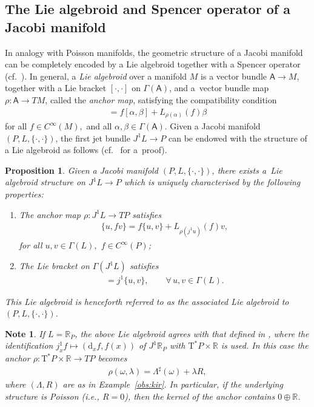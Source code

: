 \documentclass[pdftex]{sigma}
\numberwithin{equation}{section}
\newtheorem{Proposition}[Theorem]{Proposition}
\newtheorem{Note}[Theorem]{Note}
\newcommand{\de}{\mathrm{d}} %
\newcommand{\cotan}{\mathrm{T}^*} %
\newcommand{\RR}{\mathbb{R}}
\begin{document}
\subsection{The Lie algebroid and Spencer operator of a Jacobi manifold}\label{sec:lie-algebr-assoc}
In analogy with Poisson manifolds, the geometric structure of a Jacobi manifold can be completely encoded by a Lie algebroid together with a Spencer operator (cf.\ \cite{Maria-Crainic,Maria,Dazord,Kerbrat}). In general, a {\it Lie algebroid} over a manifold $M$ is a vector bundle $\mathsf{A} \to M$, together with a Lie bracket $[\cdot,\cdot]$ on $\Gamma(\mathsf{A})$, and a~vector bundle map $\rho\colon \mathsf{A}\to TM$, called the {\it anchor map}, satisfying the compatibility condition
\begin{gather*}[\alpha,f\beta]=f[\alpha,\beta]+L_{\rho(\alpha)}(f)\beta\end{gather*}
for all $f\in C^{\infty}(M),$ and all $\alpha,\beta \in \Gamma(\mathsf{A})$. Given a Jacobi manifold $(P,L,\{\cdot,\cdot\})$, the f\/irst jet bundle $J^1 L \to P$ can be endowed with the structure of a Lie algebroid as follows (cf.~\cite{Maria-Crainic} for a~proof).

\begin{Proposition}\label{prop:alg}
Given a Jacobi manifold $(P, L,\{\cdot,\cdot\})$, there exists a~Lie algebroid structure on $J^1 L \to P$ which is uniquely characterised by the following properties:
 \begin{enumerate}[label={\rm (\Roman*)}, ref={\rm (\Roman*)}]\itemsep=0pt
 \item\label{item:A} The anchor map $\rho\colon J^1 L\to T P$ satisfies
 \begin{gather*}\{u,fv\}=f\{u,v\}+L_{\rho(j^1u)}(f)v,\end{gather*}
 for all $u,v\in\Gamma(L),$ $f\in C^\infty(P)$;
 \item\label{item:B} The Lie bracket on $\Gamma(J^1 L)$ satisfies
 \begin{gather*}[j^1u,j^1v]=j^1\{u,v\},\qquad \forall \, u,v\in\Gamma(L).\end{gather*}
 \end{enumerate}
 This Lie algebroid is henceforth referred to as the associated Lie algebroid to $(P,L,\{\cdot,\cdot\})$.
\end{Proposition}

\begin{Note}\label{obs:trivial_case} If $L=\RR_P$, the above Lie algebroid agrees with that def\/ined in \cite[Def\/inition~1.4]{jacobi}, where the identif\/ication $j^1_xf\mapsto (\de_x f,f(x))$ of $J^1\RR_P$ with $\cotan P\times\RR $ is used. In this case the anchor $\rho\colon \cotan P\times\RR\to TP$ becomes
 \begin{gather*}\rho(\omega,\lambda)=\Lambda^\sharp(\omega)+\lambda R,\end{gather*}
where $(\Lambda,R)$ are as in Example~\ref{obs:kir}. In particular, if the underlying structure is Poisson (i.e., $R=0$), then the kernel of the anchor contains $0 \oplus \RR$.
\end{Note}
\end{document}
